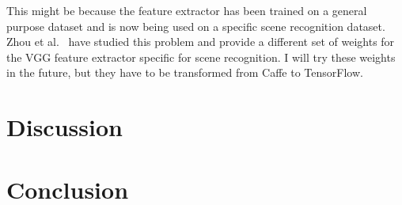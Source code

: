 \documentclass[11pt,twocolumn]{article}
\newcommand{\tf}{TensorFlow}
\begin{document}
This might be because the feature extractor has been trained on a general purpose dataset and is now being used on a specific scene recognition dataset.
Zhou et al.~\cite{zhou_learning_2014} have studied this problem and provide a different set of weights for the VGG feature extractor specific for scene recognition.
I will try these weights in the future, but they have to be transformed from Caffe to \tf{}.

\section{Discussion}
\label{sec:discussion}

\section{Conclusion}
\label{sec:conclusion}



\end{document}
